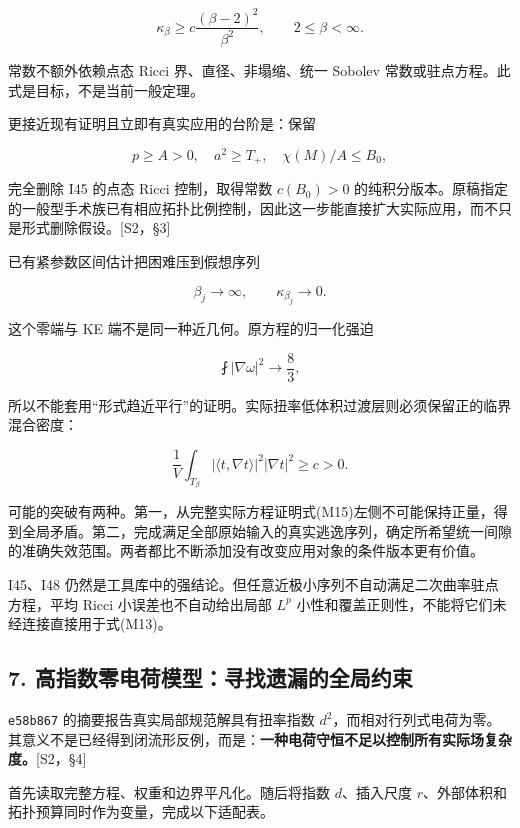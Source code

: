 \documentclass[UTF8,a4paper,11pt,fontset=fandol]{ctexart}
\begin{document}
\[
\boxed{\kappa_\beta\ge c\frac{(\beta-2)^2}{\beta^2},
\qquad2\le\beta<\infty.}
\tag{M12}
\]

常数不额外依赖点态 Ricci 界、直径、非塌缩、统一 Sobolev
常数或驻点方程。此式是目标，不是当前一般定理。

更接近现有证明且立即有真实应用的台阶是：保留

\[
p\ge A>0,\quad a^2\ge T_+,\quad\chi(M)/A\le B_0,
\]

完全删除 I45 的点态 Ricci 控制，取得常数 \(c(B_0)>0\)
的纯积分版本。原稿指定的一般型手术族已有相应拓扑比例控制，因此这一步能直接扩大实际应用，而不只是形式删除假设。{[}S2，§3{]}

已有紧参数区间估计把困难压到假想序列

\[
\beta_j\to\infty,\qquad\kappa_{\beta_j}\to0.
\tag{M13}
\]

这个零端与 KE 端不是同一种近几何。原方程的归一化强迫

\[
\fint|\nabla\omega|^2\to\frac83,
\tag{M14}
\]

所以不能套用``形式趋近平行''的证明。实际扭率低体积过渡层则必须保留正的临界混合密度：

\[
\frac1V\int_{T_\beta}
|\langle t,\nabla t\rangle|^2|\nabla t|^2\ge c>0.
\tag{M15}
\]

可能的突破有两种。第一，从完整实际方程证明式(M15)左侧不可能保持正量，得到全局矛盾。第二，完成满足全部原始输入的真实逃逸序列，确定所希望统一间隙的准确失效范围。两者都比不断添加没有改变应用对象的条件版本更有价值。

I45、I48
仍然是工具库中的强结论。但任意近极小序列不自动满足二次曲率驻点方程，平均
Ricci 小误差也不自动给出局部 \(L^p\)
小性和覆盖正则性，不能将它们未经连接直接用于式(M13)。

\subsection{7.
高指数零电荷模型：寻找遗漏的全局约束}\label{ux9ad8ux6307ux6570ux96f6ux7535ux8377ux6a21ux578bux5bfbux627eux9057ux6f0fux7684ux5168ux5c40ux7ea6ux675f}

\texttt{e58b867} 的摘要报告真实局部规范解具有扭率指数
\(d^2\)，而相对行列式电荷为零。其意义不是已经得到闭流形反例，而是：\textbf{一种电荷守恒不足以控制所有实际场复杂度。}{[}S2，§4{]}

首先读取完整方程、权重和边界平凡化。随后将指数 \(d\)、插入尺度
\(r\)、外部体积和拓扑预算同时作为变量，完成以下适配表。
\end{document}
